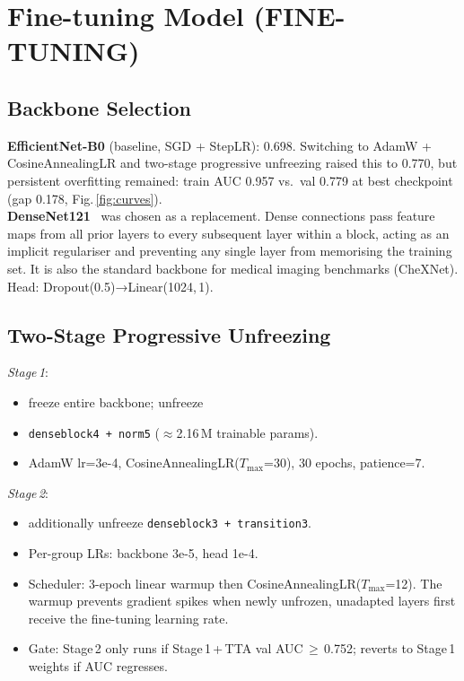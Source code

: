 \documentclass[a4paper, 10pt, twocolumn]{article}
\begin{document}
\vspace{20pt}
\section{Fine-tuning Model (FINE-TUNING)}

\subsection{Backbone Selection}

\textbf{EfficientNet-B0} (baseline, SGD + StepLR): 0.698.
Switching to AdamW + CosineAnnealingLR and two-stage progressive
unfreezing raised this to 0.770, but persistent overfitting remained:
train AUC 0.957 vs.\ val 0.779 at best checkpoint (gap 0.178,
Fig.\,\ref{fig:curves}).\\


\textbf{DenseNet121}~\cite{huang2017densely} was chosen as a replacement.
Dense connections pass feature maps from all prior layers to every
subsequent layer within a block, acting as an implicit regulariser
and preventing any single layer from memorising the training set.
It is also the standard backbone for medical imaging benchmarks (CheXNet).
Head: Dropout(0.5)→Linear(1024,\,1). \\

\subsection{Two-Stage Progressive Unfreezing}
\textit{Stage\,1}:
\begin{itemize}
    \item  freeze entire backbone; unfreeze
    \item \texttt{denseblock4\,+\,norm5} ($\approx$2.16\,M trainable params).
    \item AdamW lr=3e-4, CosineAnnealingLR($T_\text{max}$=30), 30 epochs, patience=7.
\end{itemize}

\textit{Stage\,2}:
\begin{itemize}
    \item  additionally unfreeze \texttt{denseblock3\,+\,transition3}.
    \item Per-group LRs: backbone 3e-5, head 1e-4.
    \item Scheduler: 3-epoch linear warmup then CosineAnnealingLR($T_\text{max}$=12). The warmup prevents gradient spikes when newly unfrozen, unadapted layers  first receive the fine-tuning learning rate.
    \item Gate: Stage\,2 only runs if Stage\,1\,+\,TTA val AUC\,$\geq$\,0.752; reverts to Stage\,1 weights if AUC regresses.
\end{itemize}
\end{document}
